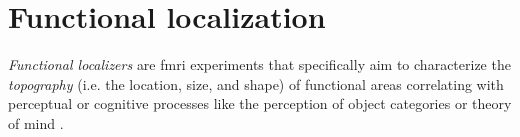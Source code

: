\section{Functional localization}




\textit{Functional localizers} \citep[cf.,][for reviews]{saxe2006divide,
friston2006critique} are \ac{fmri} experiments that specifically aim to
characterize the \textit{topography} (i.e. the location, size, and shape) of
functional areas correlating with perceptual or cognitive processes like the
perception of object categories \citep{kanwisher1997ffa} or theory of mind
\citep{spunt2014validating}.



